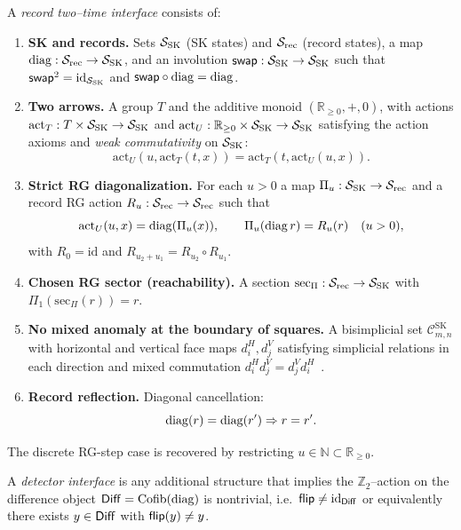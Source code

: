 \begin{definition}
\label{def:2T-rec}
A \emph{record two--time interface} consists of:
\begin{enumerate}[label=\textbf{(R\arabic*)},leftmargin=*,itemsep=0.5em]
\item \textbf{SK and records.} Sets $\mathcal S_{\mathrm{SK}}$ (SK states) and $\mathcal S_{\mathrm{rec}}$ (record states),
  a map $\operatorname{diag}:\mathcal S_{\mathrm{rec}}\to\mathcal S_{\mathrm{SK}}$, and an involution $\mathsf{swap}:\mathcal S_{\mathrm{SK}}\to\mathcal S_{\mathrm{SK}}$ such that
  $\mathsf{swap}^2=\mathrm{id}_{\mathcal S_{\mathrm{SK}}}$ and $\mathsf{swap}\circ\operatorname{diag}=\operatorname{diag}$.
\item \textbf{Two arrows.} A group $T$ and the additive monoid $(\mathbb R_{\ge 0},+,0)$,
  with actions $\mathrm{act}_T:T\times\mathcal S_{\mathrm{SK}}\to\mathcal S_{\mathrm{SK}}$ and
  $\mathrm{act}_U:\mathbb R_{\ge 0}\times\mathcal S_{\mathrm{SK}}\to\mathcal S_{\mathrm{SK}}$
  satisfying the action axioms and \emph{weak commutativity} on $\mathcal S_{\mathrm{SK}}$:
  \[
  \mathrm{act}_U(u,\mathrm{act}_T(t,x))=\mathrm{act}_T(t,\mathrm{act}_U(u,x)).
  \]
\item \textbf{Strict RG diagonalization.} For each $u>0$ a map
  $\Pi_u:\mathcal S_{\mathrm{SK}}\to\mathcal S_{\mathrm{rec}}$ and a record RG action $R_u:\mathcal S_{\mathrm{rec}}\to\mathcal S_{\mathrm{rec}}$ such that
  \[
  \mathrm{act}_U(u,x)=\operatorname{diag}(\Pi_u(x)),\qquad
  \Pi_u(\operatorname{diag} r)=R_u(r)\quad(u>0),
  \]
  with $R_0=\mathrm{id}$ and $R_{u_2+u_1}=R_{u_2}\circ R_{u_1}$.
\item \textbf{Chosen RG sector (reachability).} A section
  $\mathrm{sec}_\Pi:\mathcal S_{\mathrm{rec}}\to\mathcal S_{\mathrm{SK}}$ with $\Pi_1(\mathrm{sec}_\Pi(r))=r$.
\item \textbf{No mixed anomaly at the boundary of squares.}
  A bisimplicial set $\mathcal C^{\mathrm{SK}}_{m,n}$ with horizontal and vertical face maps
  $d_i^H,d_j^V$ satisfying simplicial relations in each direction and mixed
  commutation $d_i^H d_j^V=d_j^V d_i^H$~\cite{GoerssJardine1999Simplicial}.
\item \textbf{Record reflection.} Diagonal cancellation:
  \[
  \operatorname{diag}(r)=\operatorname{diag}(r') \Rightarrow r=r'.
  \]
\end{enumerate}
\end{definition}

\begin{remark}
The discrete RG-step case is recovered by restricting $u\in\mathbb N\subset\mathbb R_{\ge 0}$.
\end{remark}

\begin{definition}
\label{def:2T-det}
A \emph{detector interface} is any additional structure that implies the
$\mathbb Z_2$--action on the difference object $\mathsf{Diff}=\mathrm{Cofib}(\operatorname{diag})$ is
nontrivial, i.e.\ $\mathsf{flip}\neq \mathrm{id}_{\mathsf{Diff}}$ or equivalently there exists
$y\in\mathsf{Diff}$ with $\mathsf{flip}(y)\neq y$.
\end{definition}

